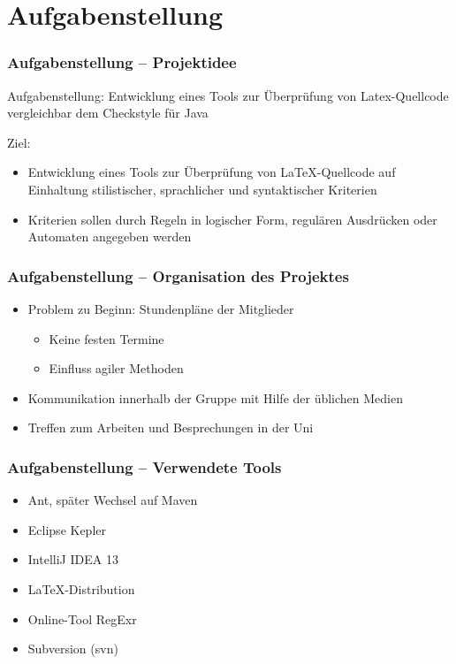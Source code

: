 \section{Aufgabenstellung}
\begin{frame}
\frametitle{Aufgabenstellung -- Projektidee}
\begin{block}{Aufgabenstellung:}
    Entwicklung eines Tools zur Überprüfung von Latex-Quellcode vergleichbar dem Checkstyle für Java
\end{block}
\begin{block}{Ziel:}
    \begin{itemize}
        \item Entwicklung eines Tools zur Überprüfung von LaTeX-Quellcode auf Einhaltung stilistischer, sprachlicher und syntaktischer Kriterien
        \item Kriterien sollen durch Regeln in logischer Form, regulären Ausdrücken oder Automaten angegeben werden
    \end{itemize}
\end{block}
\end{frame}
\begin{frame}
\frametitle{Aufgabenstellung -- Organisation des Projektes}
\begin{block}{\vspace*{-3ex}}
	\begin{itemize}
	  	\item Problem zu Beginn: Stundenpläne der Mitglieder
	  	\begin{itemize}
	  		\item Keine festen Termine
	  		\item Einfluss agiler Methoden
	  	\end{itemize}
	  	\item Kommunikation innerhalb der Gruppe mit Hilfe der üblichen Medien
	  	\item Treffen zum Arbeiten und Besprechungen in der Uni
	\end{itemize}
\end{block}
\end{frame}
\begin{frame}
\frametitle{Aufgabenstellung -- Verwendete Tools}
\begin{block}{\vspace*{-3ex}}
	\begin{itemize}
	 	\item Ant, später Wechsel auf Maven
	  	\item Eclipse Kepler
	  	\item IntelliJ IDEA 13
	  	\item \LaTeX-Distribution
	  	\item Online-Tool RegExr
	  	\item Subversion (svn) 
	\end{itemize}
\end{block}
\end{frame}
